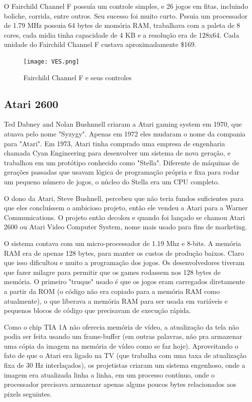 \documentclass[12pt]{article}
\begin{document}
O Fairchild Channel F possuía um controle simples, e 26 jogos em fitas, incluindo boliche, corrida, entre outros. Seu sucesso foi muito curto. Pssuia um processador de 1.79 MHz possuia 64 bytes de momória RAM, trabalhava com a paleta de 8 cores, cada midia tinha capacidade de 4 KB e a resoluç\~{a}o era de 128x64. Cada unidade do Fairchild Channel F custava aproximadamente \$169.
\begin{figure}[!htb]
    \centering
    \texttt{[image: VES.png]}
    \caption{Fairchild Channel F e seus controles}
    \label{fig:controle}
\end{figure}

\subsection{Atari 2600}
Ted Dabney and Nolan Bushnnell criaram a Atari gaming system em 1970, que atuava pelo nome "Syzygy". Apenas em 1972 eles mudaram o nome da compania para "Atari". Em 1973, Atari tinha comprado uma empresa de engenharia chamada Cyan Engineering para desenvolver um sistema de nova geração, e trabalhou em um protótipo conhecido como "Stella". Diferente de máquinas de gerações passadas que usavam lógica de programação própria e fixa para rodar um pequeno número de jogos, o núcleo do Stella era um CPU completo.

O dono da Atari, Steve Bushnell, percebeu que não teria fundos suficientes para que eles concluíssem o ambicioso projeto, então ele vendeu a Atari para a Warner Communications. O projeto então decolou e quando foi lançado se chamou Atari 2600 ou Atari Video Computer System, nome mais usado para fins de marketing.

O sistema contava com um micro-processador de 1.19 Mhz e 8-bits. A memória RAM era de apenas 128 bytes, para manter os custos de produção baixos. Claro que isso dificultou e muito a programação dos jogos. Os desenvolvedores tiveram que fazer milagre para permitir que os games rodassem nos 128 bytes de memória. O primeiro "truque" usado é que os jogos eram carregados diretamente a partir da ROM (o código não era copiado para a memória RAM como atualmente), o que liberava a memória RAM para ser usada em variáveis e pequenos blocos de código que precisavam de execução rápida.
 
Como o chip TIA 1A não oferecia memória de vídeo, a atualização da tela não podia ser feita usando um frame-buffer (em outras palavras, não pra armazenar uma cópia da imagem na memória de vídeo como se faz hoje). Aproveitando o fato de que o Atari era ligado na TV (que trabalha com uma taxa de atualização fixa de 30 Hz interlaçados), os projetistas criaram um sistema engenhoso, onde a imagem era atualizada linha a linha, em um processo contínuo, onde o processador precisava armazenar apenas alguns poucos bytes relacionados aos pixels seguintes.
\end{document}
